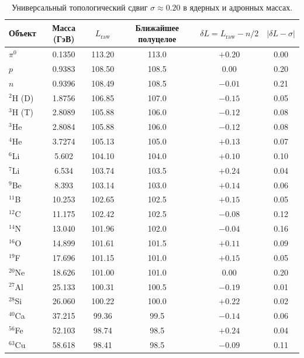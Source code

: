 \documentclass[12pt,a4paper]{article}
\begin{document}
	\begin{table}[htbp]
		\centering
		\caption{Универсальный топологический сдвиг \(\sigma \approx 0.20\) в ядерных и адронных массах.}
		\label{tab:nuclear_sigma}
		\small
		\begin{tabular}{l c c c c c}
			\toprule
			Объект & Масса (ГэВ) & \(L_{\mathrm{raw}}\) & Ближайшее полуцелое & \(\delta L = L_{\mathrm{raw}} - n/2\) & \(|\delta L - \sigma|\) \\
			\midrule
			\(\pi^0\) & 0.1350 & 113.20 & 113.0 & \(+0.20\) & 0.00 \\
			\(p\)     & 0.9383 & 108.50 & 108.5 & \(0.00\)  & 0.20 \\
			\(n\)     & 0.9396 & 108.49 & 108.5 & \(-0.01\) & 0.21 \\
			\(^2\)H (D) & 1.8756 & 106.85 & 107.0 & \(-0.15\) & 0.05 \\
			\(^3\)H (T) & 2.8089 & 105.88 & 106.0 & \(-0.12\) & 0.08 \\
			\(^3\)He & 2.8084 & 105.88 & 106.0 & \(-0.12\) & 0.08 \\
			\(^4\)He & 3.7274 & 105.13 & 105.0 & \(+0.13\) & 0.07 \\
			\(^6\)Li & 5.602  & 104.10 & 104.0 & \(+0.10\) & 0.10 \\
			\(^7\)Li & 6.534  & 103.74 & 103.5 & \(+0.24\) & 0.04 \\
			\(^9\)Be & 8.393  & 103.14 & 103.0 & \(+0.14\) & 0.06 \\
			\(^{11}\)B & 10.253 & 102.65 & 102.5 & \(+0.15\) & 0.05 \\
			\(^{12}\)C & 11.175 & 102.42 & 102.5 & \(-0.08\) & 0.12 \\
			\(^{14}\)N & 13.040 & 101.96 & 102.0 & \(-0.04\) & 0.16 \\
			\(^{16}\)O & 14.899 & 101.61 & 101.5 & \(+0.11\) & 0.09 \\
			\(^{19}\)F & 17.696 & 101.15 & 101.0 & \(+0.15\) & 0.05 \\
			\(^{20}\)Ne & 18.626 & 101.00 & 101.0 & \(0.00\)  & 0.20 \\
			\(^{27}\)Al & 25.133 & 100.31 & 100.5 & \(-0.19\) & 0.01 \\
			\(^{28}\)Si & 26.060 & 100.22 & 100.0 & \(+0.22\) & 0.02 \\
			\(^{40}\)Ca & 37.215 & 99.36  & 99.5  & \(-0.14\) & 0.06 \\
			\(^{56}\)Fe & 52.103 & 98.74  & 98.5  & \(+0.24\) & 0.04 \\
			\(^{63}\)Cu & 58.618 & 98.41  & 98.5  & \(-0.09\) & 0.11 \\

\end{tabular}
\end{table}
\end{document}
